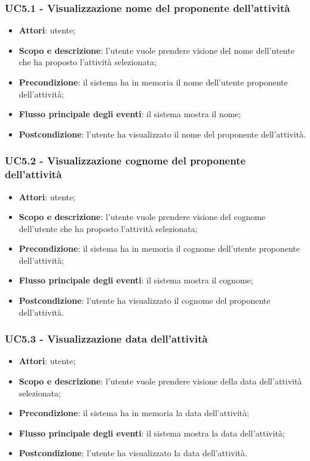 \subsubsection{UC5.1 - Visualizzazione nome del proponente dell’attività }
\begin{itemize}
	\item \textbf{Attori}: utente;
	\item \textbf{Scopo e descrizione}: l’utente vuole prendere visione del nome dell'utente che ha proposto l'attività selezionata;
	\item \textbf{Precondizione}: il sistema ha in memoria il nome dell'utente proponente dell'attività;
	\item \textbf{Flusso principale degli eventi}: il sistema mostra il nome;
	\item \textbf{Postcondizione}: l’utente ha visualizzato il nome del proponente dell’attività.
\end{itemize}

\subsubsection{UC5.2 - Visualizzazione cognome del proponente dell’attività }
\begin{itemize}
	\item \textbf{Attori}: utente;
	\item \textbf{Scopo e descrizione}: l’utente vuole prendere visione del cognome dell'utente che ha proposto l'attività selezionata;
	\item \textbf{Precondizione}: il sistema ha in memoria il cognome dell'utente proponente dell'attività;
	\item \textbf{Flusso principale degli eventi}: il sistema mostra il cognome;
	\item \textbf{Postcondizione}: l’utente ha visualizzato il cognome del proponente dell’attività.
\end{itemize}

\subsubsection{UC5.3 - Visualizzazione data dell’attività }
\begin{itemize}
	\item \textbf{Attori}: utente;
	\item \textbf{Scopo e descrizione}: l’utente vuole prendere visione della data dell'attività selezionata;
	\item \textbf{Precondizione}: il sistema ha in memoria la data dell'attività;
	\item \textbf{Flusso principale degli eventi}: il sistema mostra la data dell'attività;
	\item \textbf{Postcondizione}: l’utente ha visualizzato la data dell'attività.
\end{itemize}

